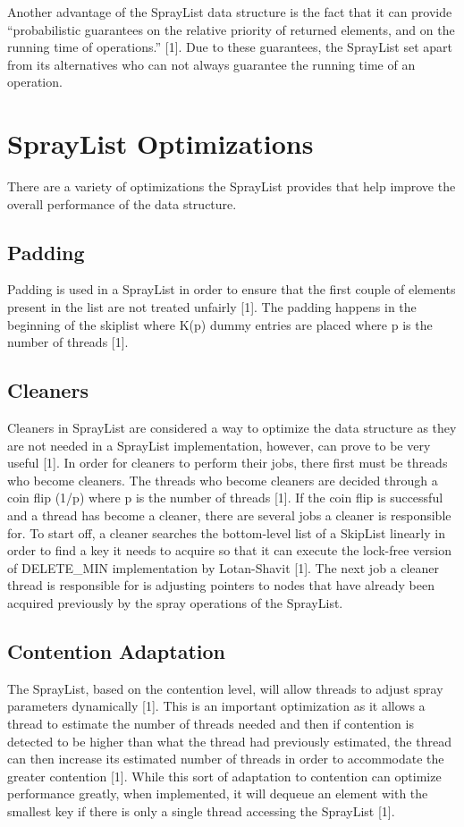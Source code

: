 \documentclass[conference]{IEEEtran}
\begin{document}
Another advantage of the SprayList data structure is the fact that it can provide “probabilistic guarantees on the relative priority of returned elements, and on the running time of operations.”  [1].  Due to these guarantees, the SprayList set apart from its alternatives who can not always guarantee the running time of an operation. 

\section{SprayList Optimizations}
There are a variety of optimizations the SprayList provides that help improve the overall performance of the data structure.

\subsection{Padding}

Padding is used in a SprayList in order to ensure that the first couple of elements present in the list are not treated unfairly [1]. The padding happens in the beginning of the skiplist where K(p) dummy entries are placed where p is the number of threads [1].

\subsection{Cleaners}
Cleaners in SprayList are considered a way to optimize the data structure as they are not needed in a SprayList implementation, however, can prove to be very useful [1]. In order for cleaners to perform their jobs, there first must be threads who become cleaners. The threads who become cleaners are decided through a coin flip  (1/p) where p is the number of threads [1]. If the coin flip is successful and a thread has become a cleaner, there are several jobs a cleaner is responsible for.  To start off, a cleaner searches the bottom-level list of a SkipList linearly in order to find a key it needs to acquire so that it can execute the lock-free version of DELETE_MIN implementation by Lotan-Shavit [1]. The next job a cleaner thread is responsible for is adjusting pointers to nodes that have already been acquired previously by the spray operations of the SprayList.

\subsection{Contention Adaptation}

The SprayList, based on the contention level, will allow threads to adjust spray parameters dynamically [1]. This is an important optimization  as it allows a thread to estimate the number of threads needed and then if contention is detected to be higher than what the thread had previously estimated, the thread can then increase its estimated number of threads in order to accommodate the greater contention [1]. While this sort of adaptation to contention can optimize performance greatly, when implemented, it will dequeue an element with the smallest key if there is only a single thread accessing the SprayList [1].
\end{document}
